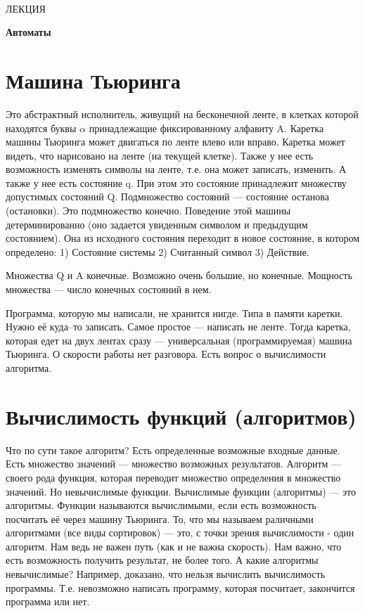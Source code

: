 \documentclass[a4paper,12pt]{article}
\theoremstyle{plain} %
\theoremstyle{definition} %
\theoremstyle{remark} %
\begin{document}
\newcommand{\lec}[1]{\addtocounter{lec}{1} \setcounter{section}{0}%
\begin{center}
{\LARGE ЛЕКЦИЯ %
\vspace{2mm}%

\textbf{#1}%
}
\end{center}
}
\newpage
\
\setcounter{lec}{26}
\lec{Автоматы}
\section{Машина Тьюринга}
Это абстрактный исполнитель, живущий на бесконечной ленте, в клетках которой находятся буквы $\alpha$ принадлежащие фиксированному алфавиту A. Каретка машины Тьюринга может двигаться по ленте влево или вправо. Каретка может видеть, что нарисовано на ленте (на текущей клетке). Также у нее есть возможность изменять символы на ленте, т.е. она может записать, изменить. А также у нее есть состояние q. При этом это состояние принадлежит множеству допустимых состояний Q. Подмножество состояний --- состояние останова (остановки). Это подмножество конечно. Поведение этой машины детерминированно (оно задается увиденным символом и предыдущим состоянием). Она из исходного состояния переходит в новое состояние, в котором определено: 1) Состояние системы 2) Считанный символ 3) Действие.

Множества Q и A конечные. Возможно очень большие, но конечные. Мощность множества --- число конечных состояний в нем.

Программа, которую мы написали, не хранится нигде. Типа в памяти каретки. Нужно её куда--то записать. Самое простое --- написать не ленте. Тогда каретка, которая едет на двух лентах сразу --- универсальная (программируемая) машина Тьюринга. О скорости работы нет разговора. Есть вопрос о вычислимости алгоритма.
\section{Вычислимость функций (алгоритмов)}
Что по сути такое алгоритм? Есть определенные возможные входные данные. Есть множество значений --- множество возможных результатов. Алгоритм --- своего рода функция, которая переводит множество определения в множество значений. Но невычислимые функции. Вычислимые функции (алгоритмы) --- это алгоритмы. Функции называются вычислимыми, если есть возможность посчитать её через машину Тьюринга. То, что мы называем раличными алгоритмами (все виды сортировок) --- это, с точки зрения вычислимости - один алгоритм. Нам ведь не важен путь (как и не важна скорость). Нам важно, что есть возможность получить результат, не более того. А какие алгоритмы невычислимые? Например, доказано, что нельзя вычислить вычислимость программы. Т.е. невозможно написать программу, которая посчитает, закончится программа или нет.
\end{document}
